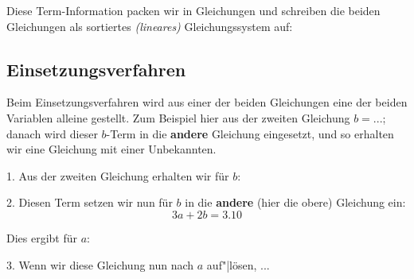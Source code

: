 
Diese Term-Information packen wir in Gleichungen und schreiben die
beiden Gleichungen als sortiertes \textit{(lineares)} Gleichungssystem auf:



\subsection{Einsetzungsverfahren}\label{einsetzungsverfahren}
Beim Einsetzungsverfahren wird aus einer der beiden Gleichungen eine der beiden Variablen alleine gestellt. Zum Beispiel hier aus der zweiten Gleichung $b = ...$; danach wird dieser $b$-Term in die \textbf{andere} Gleichung eingesetzt, und so erhalten wir eine Gleichung mit einer Unbekannten.





1. Aus der zweiten Gleichung erhalten wir für $b$:


2. Diesen Term setzen wir nun für $b$ in die \textbf{andere} (hier die obere) Gleichung ein:
$$3a+2b = 3.10$$

Dies ergibt für $a$:


3. Wenn wir diese Gleichung nun nach $a$ auf"|lösen, ...


